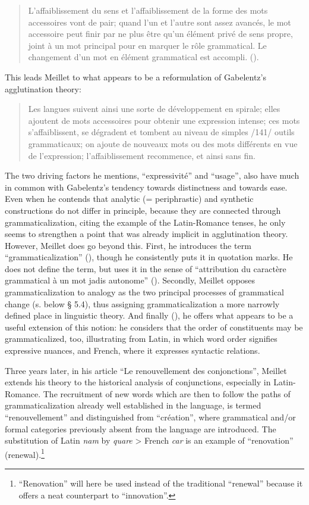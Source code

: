 \begin{quote}
L'affaiblissement du sens et l'affaiblissement de la forme des mots accessoires vont de pair; quand l'un et l'autre sont assez avancés, le mot accessoire peut finir par ne plus être qu'un élément privé de sens propre, joint à un mot principal pour en marquer le rôle grammatical. Le changement d'un mot en élément grammatical est accompli. (\citeyear[139]{Meillet1912}). \label{meillet}
\end{quote}

\noindent This leads Meillet to what appears to be a reformulation of Gabelentz's agglutination theory:

\begin{quote}
Les langues suivent ainsi une sorte de développement en spirale; elles ajoutent de mots accessoires pour obtenir une expression intense; ces mots s'affaiblissent, se dégradent et tombent au niveau de simples /141/ outils grammaticaux; on ajoute de nouveaux mots ou des mots différents en vue de l'expression; l'affaiblissement recommence, et ainsi sans fin.
\end{quote}

\noindent The two driving factors he mentions, “expressivité” and “usage”, also have much in common with Gabelentz's tendency towards distinctness and towards ease. Even when he contends that analytic (= periphrastic) and synthetic constructions do not differ in principle, because they are connected through grammaticalization, citing the example of the Latin-Romance tenses, he only seems to strengthen a point that was already implicit in agglutination theory. However, Meillet does go beyond this. First, he introduces the term ``grammaticalization'' (\citeyear[133]{Meillet1912}), though he consistently puts it in quotation marks. He does not define the term, but uses it in the sense of “attribution du caractère grammatical à un mot jadis autonome” (\citeyear[131]{Meillet1912}). Secondly, Meillet opposes grammaticalization to analogy as the two principal processes of grammatical change (s. below § 5.4), thus assigning grammaticalization a more narrowly defined place in linguistic theory. And finally (\citeyear[147f]{Meillet1912}), he offers what appears to be a useful extension of this notion: he considers that the order of constituents may be grammaticalized, too, illustrating from Latin, in which word order signifies expressive nuances, and French, where it expresses syntactic relations.

Three years later, in his article “Le renouvellement des conjonctions”, Meillet extends his theory to the historical analysis of conjunctions, especially in Latin-Romance. The recruitment of new words which are then to follow the paths of grammaticalization already well established in the language, is termed “renouvellement” and distinguished from “création”, where grammatical and/or formal categories previously absent from the language are introduced. The substitution of Latin \textit{nam} by \textit{quare} {\textgreater} French \textit{car} is an example of ``renovation'' (renewal).\footnote{``Renovation'' will here be used instead of the traditional ``renewal'' because it offers a neat counterpart to ``innovation''.}

